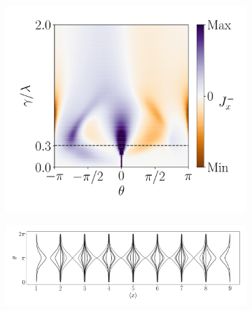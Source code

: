 \begin{figure}[h!]
\begin{minipage}[h!]{1\textwidth}
\begin{subfigure}[b!]{0.35 \textwidth}
         \end{subfigure}\hspace*{-0.5em}
         \begin{subfigure}[b!]{0.35 \textwidth}
             \caption{}
             \includegraphics[width=\textwidth]{Imagenes/Resultados_pump_Fractal/x/current_square_pump_negx.pdf}
         \end{subfigure}\hspace*{-0.5em}
     \end{minipage}\vspace*{-1em}
     
     
     \begin{minipage}[h!]{1\textwidth}
         \begin{subfigure}[b!]{1.0 \textwidth}
             \caption{}
             \includegraphics[width=\textwidth]{Imagenes/Resultados_pump_Fractal/x/wannier_centerx.pdf}
         \end{subfigure}\hspace*{-0.5em}
     \end{minipage}\vspace*{-1em}
     


\end{figure}
